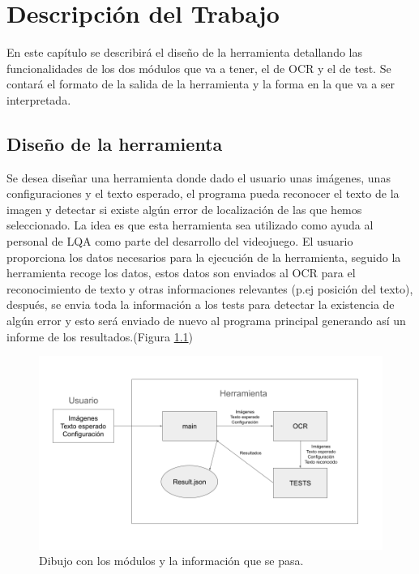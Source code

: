 \chapter{Descripción del Trabajo}
\label{cap:descripcionTrabajo}

En este capítulo se describirá el diseño de la herramienta detallando las funcionalidades de los dos módulos que va a tener, el de OCR y el de test. Se contará el formato de la salida de la herramienta y la forma en la que va a ser interpretada.

\section{Diseño de la herramienta}
\label{sec:Descripción de la herramienta}
Se desea diseñar una herramienta donde dado el usuario unas imágenes, unas configuraciones y el texto esperado, el programa pueda reconocer el texto de la imagen y detectar si existe algún error de localización de las que hemos seleccionado.
La idea es que esta herramienta sea utilizado como ayuda al personal de LQA como parte del desarrollo del videojuego.
El usuario proporciona los datos necesarios para la ejecución de la herramienta, seguido la herramienta recoge los datos, estos datos son enviados al OCR para el reconocimiento de texto y otras informaciones relevantes (p.ej posición del texto), después, se envia toda la información a los tests para detectar la existencia de algún error y esto será enviado de nuevo al programa principal generando así un informe de los resultados.(Figura \ref{fig:Descripcion_Herramienta})
\begin{figure}[h]
	\centering
	\includegraphics[width = 1\textwidth]{Imagenes/Descripcion_Herramienta.png}
	\caption{Dibujo con los módulos y la información que se pasa.}
	\label{fig:Descripcion_Herramienta}
\end{figure}


